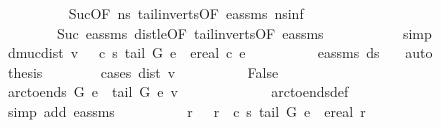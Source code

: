 \begin{isabellebody}
\ \ \ \ \ \ \ \ \isamarkupfalse%
\ Suc{\isacharparenleft}{}{\isacharparenright}{\isacharbrackleft}OF\ ns\ tail{\isacharunderscore}in{\isacharunderscore}verts{\isacharbrackleft}OF\ e{\isacharunderscore}assms{\isacharparenleft}{}{\isacharparenright}{\isacharbrackright}\ nsinf{\isacharbrackright}\ \isanewline
\ \ \ \ \ \ \ \ Suc{\isacharparenleft}{}{\isacharminus}{}{\isacharparenright}\ e{\isacharunderscore}assms{\isacharparenleft}{}{\isacharparenright}\ dist{\isacharunderscore}le{\isacharunderscore}{\isasymmu}{\isacharbrackleft}OF\ tail{\isacharunderscore}in{\isacharunderscore}verts{\isacharbrackleft}OF\ e{\isacharunderscore}assms{\isacharparenleft}{}{\isacharparenright}{\isacharbrackright}{\isacharbrackright}\ \isanewline
\ \ \ \ \ \ \ \ \isamarkupfalse%
\ simp\isanewline
\ \ \ \ \ \ \isamarkupfalse%
\ dmuc{\isacharcolon}{\isachardoublequoteopen}dist\ v\ {\isacharequal}\ {\isasymmu}\ c\ s\ {\isacharparenleft}tail\ G\ e{\isacharparenright}\ {\isacharplus}\ ereal\ {\isacharparenleft}c\ e{\isacharparenright}{\isachardoublequoteclose}\isanewline
\ \ \ \ \ \ \ \ \isamarkupfalse%
\ e{\isacharunderscore}assms{\isacharparenleft}{}{\isacharparenright}\ ds\ \ \isamarkupfalse%
\ auto\isanewline
\ \ \ \ \ \ \isamarkupfalse%
\ {\isacharquery}thesis\isanewline
\ \ \ \ \ \ \isamarkupfalse%
\ {\isacharparenleft}cases\ {\isachardoublequoteopen}dist\ v\ {\isacharequal}\ {\isasyminfinity}{\isachardoublequoteclose}{\isacharparenright}\isanewline
\ \ \ \ \ \ \isamarkupfalse%
\ False\isanewline
\ \ \ \ \ \ \ \ \isamarkupfalse%
\ {\isachardoublequoteopen}arc{\isacharunderscore}to{\isacharunderscore}ends\ G\ e\ {\isacharequal}\ {\isacharparenleft}tail\ G\ e{\isacharcomma}\ v{\isacharparenright}{\isachardoublequoteclose}\ \isanewline
\ \ \ \ \ \ \ \ \ \ \isamarkupfalse%
\ arc{\isacharunderscore}to{\isacharunderscore}ends{\isacharunderscore}def\isanewline
\ \ \ \ \ \ \ \ \ \ \isamarkupfalse%
\ {\isacharparenleft}simp\ add{\isacharcolon}\ e{\isacharunderscore}assms{\isacharparenleft}{}{\isacharparenright}{\isacharparenright}\isanewline
\ \ \ \ \ \ \ \ \isamarkupfalse%
\ r\ \ \ {\isasymmu}r{\isacharcolon}\ {\isachardoublequoteopen}{\isasymmu}\ c\ s\ {\isacharparenleft}tail\ G\ e{\isacharparenright}\ {\isacharequal}\ ereal\ r{\isachardoublequoteclose}\isanewline
\ \ \ \ \ \ \ \ \ \ \ \isamarkupfalse%

\end{isabellebody}
